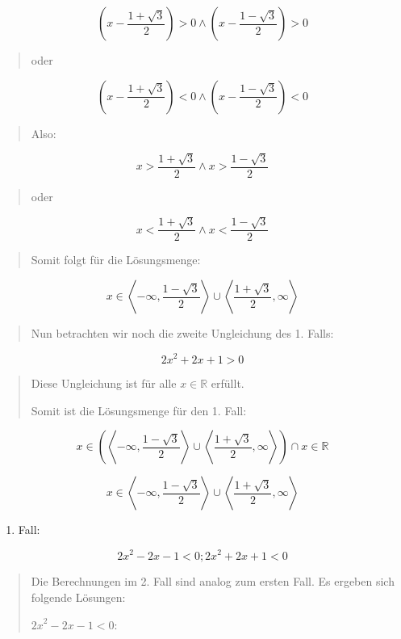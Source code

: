 \documentclass[a4paper, 12pt]{book}
\begin{document}
\[(x - \frac{1 + \sqrt{3}}{2}) > 0 \land (x - \frac{1 - \sqrt{3}}{2}) > 0\]

\begin{quote}
oder
\end{quote}

\[(x - \frac{1 + \sqrt{3}}{2}) < 0 \land (x - \frac{1 - \sqrt{3}}{2}) < 0\]

\begin{quote}
Also:
\end{quote}

\[x > \frac{1 + \sqrt{3}}{2} \land x > \frac{1 - \sqrt{3}}{2}\]

\begin{quote}
oder
\end{quote}

\[x < \frac{1 + \sqrt{3}}{2} \land x < \frac{1 - \sqrt{3}}{2}\]

\begin{quote}
Somit folgt für die Lösungsmenge:
\end{quote}

\[x \in \left\langle  - \infty,\frac{1 - \sqrt{3}}{2} \right\rangle \cup \left\langle \frac{1 + \sqrt{3}}{2},\infty \right\rangle\]

\begin{quote}
Nun betrachten wir noch die zweite Ungleichung des 1. Falls:
\end{quote}

\[{2x}^{2} + 2x + 1 > 0\]

\begin{quote}
Diese Ungleichung ist für alle \(x\mathbb{ \in R}\) erfüllt.

Somit ist die Lösungsmenge für den 1. Fall:
\end{quote}

\[x \in (\left\langle  - \infty,\frac{1 - \sqrt{3}}{2} \right\rangle \cup \left\langle \frac{1 + \sqrt{3}}{2},\infty \right\rangle) \cap x\mathbb{ \in R}\]

\[x \in \left\langle  - \infty,\frac{1 - \sqrt{3}}{2} \right\rangle \cup \left\langle \frac{1 + \sqrt{3}}{2},\infty \right\rangle\]

\begin{enumerate}
\def\labelenumi{\arabic{enumi}.}
\setcounter{enumi}{1}
\item
  Fall:
\end{enumerate}

\[{2x}^{2} - 2x - 1 < 0;{2x}^{2} + 2x + 1 < 0\]

\begin{quote}
Die Berechnungen im 2. Fall sind analog zum ersten Fall. Es ergeben sich
folgende Lösungen:

\({2x}^{2} - 2x - 1 < 0\):
\end{quote}
\end{document}
